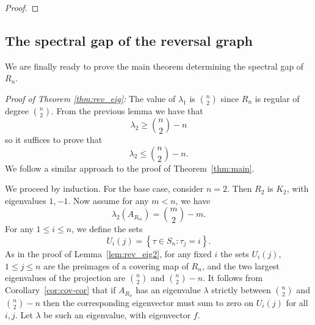 \begin{proof}
  
%
%
%
\end{proof}

\subsection{The spectral gap of the reversal graph}

We are finally ready to prove the main theorem determining the spectral gap of $R_n$.

\noindent
{\it Proof of Theorem \ref{thm:rev_eig}:}
 The value of $\lambda_1$ is $\binom n 2$ since $R_n$ is regular of degree $\binom n 2$.   
 From the previous lemma we have that 
  \[ \lambda_2 \geq \binom{n}{2} - n\]
 so it suffices to prove that
  \[ \lambda_2 \leq \binom{n}{2} - n .\]
 We follow a similar approach to the proof of 
 Theorem~\ref{thm:main}.  
 
 
 We proceed by induction.  For the base case, consider $n=2$.  Then $R_2$
 is $K_2$, with eigenvalues $1,-1$.  Now assume for any $m < n$, we have
 \[  \lambda_2(A_{R_m}) = \binom{m}{2} - m . \]
 For any $1 \leq i \leq n$, we define the sets
  \[ U_i(j) = \left\{ \tau \in S_n : \tau_j = i \right\}. \]
 As in the proof of Lemma~\ref{lem:rev_eig2}, for any fixed $i$ the sets 
 $U_i(j)$, $1 \leq j \leq n$ are the preimages of a covering map of $R_n$,
 and the two largest eigenvalues of the projection are $\binom{n}{2}$ and
 $\binom{n}{2} - n$.  It follows from Corollary~\ref{cor:cov-cor}
 that if $A_{R_n}$ has an eigenvalue $\lambda$ strictly between $\binom{n}{2}$
 and $\binom{n}{2} - n$ then the corresponding eigenvector must sum to zero
 on $U_i(j)$ for all $i,j$.  Let $\lambda$ be such an eigenvalue, with 
 eigenvector $f$.
 
